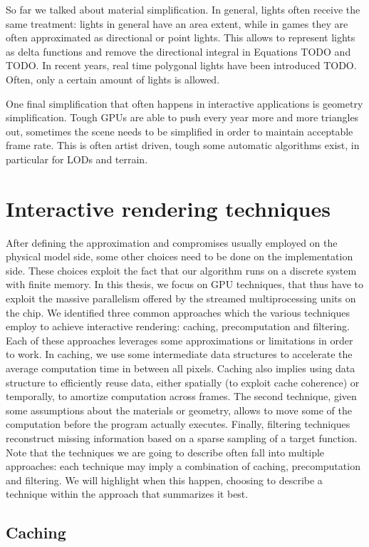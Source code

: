 So far we talked about material simplification. In general, lights often receive the same treatment: lights in general have an area extent, while in games they are often approximated as directional or point lights. This allows to represent lights as delta functions and remove the directional integral in Equations TODO and TODO. In recent years, real time polygonal lights have been introduced TODO. Often, only a certain amount of lights is allowed. 

One final simplification that often happens in interactive applications is geometry simplification. Tough GPUs are able to push every year more and more triangles out, sometimes the scene needs to be simplified in order to maintain acceptable frame rate. This is often artist driven, tough some automatic algorithms exist, in particular for LODs and terrain.   

\section{Interactive rendering techniques}
%
After defining the approximation and compromises usually employed on the physical model side, some other choices need to be done on the implementation side. These choices exploit the fact that our algorithm runs on a discrete system with finite memory. In this thesis, we focus on GPU techniques, that thus have to exploit the massive parallelism offered by the streamed multiprocessing units on the chip. We identified three common approaches which the various techniques employ to achieve interactive rendering: caching, precomputation and filtering. Each of these approaches leverages some approximations or limitations in order to work. In caching, we use some intermediate data structures to accelerate the average computation  time in between all pixels. Caching also implies using data structure to efficiently reuse data, either spatially (to exploit cache coherence) or temporally, to amortize computation across frames. The second technique, given some assumptions about the materials or geometry, allows to move some of the computation before the program actually executes. Finally, filtering techniques reconstruct missing information based on a sparse sampling of a target function. Note that the techniques we are going to describe often fall into multiple approaches: each technique may imply a combination of caching, precomputation and filtering. We will highlight when this happen, choosing to describe a technique within the approach that summarizes it best.
%
\subsection{Caching}

